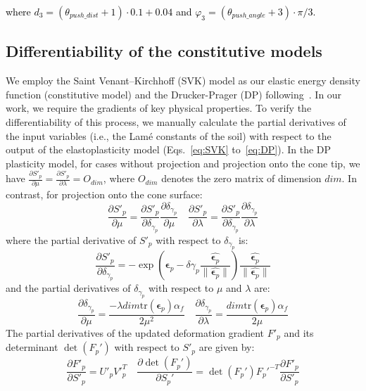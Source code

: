 \documentclass[letterpaper, 10 pt, journal, twoside]{ieeetran}
\newcommand{\rp}[1]{\textcolor{black}{#1}}
\begin{document}
\noindent\rp{where $d_3=(\theta_{push\_dist}+1)\cdot0.1+0.04$ and $\varphi_3=(\theta_{push\_angle}+3)\cdot\pi/3$.}

\subsection{Differentiability of the constitutive models}
We employ the Saint Venant–Kirchhoff (SVK) model as our elastic energy density function (constitutive model) and the Drucker-Prager (DP) following~\cite{klar2016drucker}. In our work, we require the gradients of key physical properties. To verify the differentiability of this process, we manually calculate the partial derivatives of the input variables (i.e., the Lam\'e constants of the soil) with respect to the output of the elastoplasticity model (Eqs.~\ref{eq:SVK} to~\ref{eq:DP}). In the DP plasticity model, for cases without projection and projection onto the cone tip, we have $\frac{\partial S'_p}{\partial \mu} = \frac{\partial S'_p}{\partial \lambda} = O_{dim}$, where $O_{dim}$ denotes the zero matrix of dimension $dim$. In contrast, for projection onto the cone surface:
\begin{equation}
\frac{\partial S'_p}{\partial \mu} = \frac{\partial S'_p}{\partial \delta_{\gamma_{p}}}\frac{\partial \delta_{\gamma_{p}}}{\partial \mu} \quad \frac{\partial S'_p}{\partial \lambda} = \frac{\partial S'_p}{\partial \delta_{\gamma_{p}}}\frac{\partial \delta_{\gamma_{p}}}{\partial \lambda}
\end{equation}
where the partial derivative of $S'_p$ with respect to $\delta_{\gamma_{p}}$ is:
\begin{equation}
\frac{\partial S'_p}{\partial \delta_{\gamma_{p}}} = -\exp(\pmb{\epsilon}_p-\delta \gamma_{p}\frac{\hat{\pmb{\epsilon}_p}}{\|\hat{\pmb{\epsilon}_p}\|}) \frac{\hat{\pmb{\epsilon}_p}}{\|\hat{\pmb{\epsilon}_p}\|}
\end{equation}
and the partial derivatives of $\delta_{\gamma_{p}}$ with respect to $\mu$ and $\lambda$ are:
\begin{equation}
\frac{\partial \delta_{\gamma_{p}}}{\partial \mu} = \frac{- \lambda dim \mathrm{tr}(\pmb{\epsilon}_p)\alpha_f}{2\mu^{2}} \quad \frac{\partial \delta_{\gamma_{p}}}{\partial \lambda} = \frac{dim \mathrm{tr}(\pmb{\epsilon}_p)\alpha_f}{2\mu}
\end{equation}
The partial derivatives of the updated deformation gradient $F'_p$ and its determinant $\det(F_p')$ with respect to $S'_p$ are given by:
\begin{equation}
\frac{\partial F'_p}{\partial S'_p} = U'_p V'^{T}_p \quad \frac{\partial \det(F_p')}{\partial S_p'} =
\det(F_p') F_p'^{-T} \frac{\partial F'_p}{\partial S'_p}
\end{equation}
\end{document}
